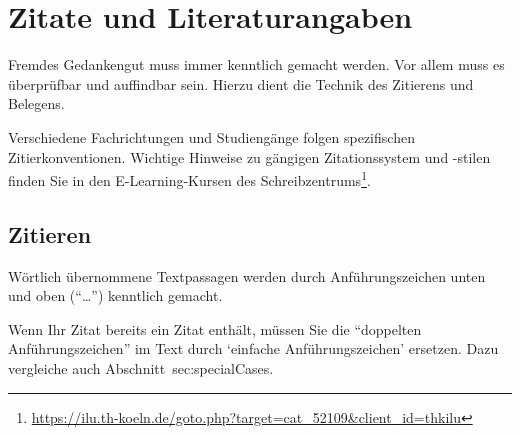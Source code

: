 \chapter{Zitate und Literaturangaben}
\label{chap:literature}
%
Fremdes Gedankengut muss immer kenntlich gemacht werden. Vor allem muss es überprüfbar und auffindbar sein. Hierzu dient die Technik des Zitierens und Belegens.
\par
Verschiedene Fachrichtungen und Studiengänge folgen spezifischen Zitierkonventionen. Wichtige Hinweise zu gängigen Zitationssystem und -stilen finden Sie in den E-Learning-Kursen des Schreibzentrums\footnote{\href{https://ilu.th-koeln.de/goto.php?target=cat\_52109\&client\_id=thkilu}{https://ilu.th-koeln.de/goto.php?target=cat\_52109\&client\_id=thkilu}}.
%
\section{Zitieren}
\par
Wörtlich übernommene Textpassagen werden durch Anführungszeichen unten und oben (\enquote{\ldots}) kenntlich gemacht.
\par
Wenn Ihr Zitat bereits ein Zitat enthält, müssen Sie die \enquote{doppelten Anführungszeichen} im Text durch \enquote*{einfache Anführungszeichen} ersetzen. Dazu vergleiche auch Abschnitt~sec:specialCases.
%
